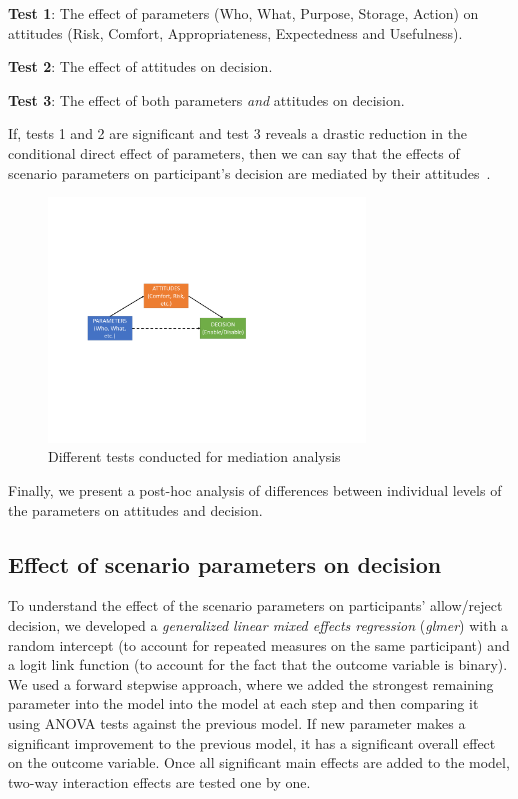 \textbf{Test 1}: The effect of parameters (Who, What, Purpose, Storage, Action) on attitudes (Risk, Comfort, Appropriateness, Expectedness and Usefulness).

\textbf{Test 2}: The effect of attitudes on decision.

\textbf{Test 3}: The effect of both parameters \emph{and} attitudes on decision.

If, tests 1 and 2 are significant and test 3 reveals a drastic reduction in the conditional direct effect of parameters, then we can say that the effects of scenario parameters on participant's decision are mediated by their attitudes~\cite{bahiratiui2018}.


\begin{figure}
	\centering
	\includegraphics[width=0.75\textwidth]{figures/mediation_test.pdf}
	\caption{Different tests conducted for mediation analysis}
	\label{fig:mediation_test}
\end{figure}


Finally, we present a post-hoc analysis of differences between individual levels of the parameters on attitudes and decision.

\subsection{Effect of scenario parameters on decision}
To understand the effect of the scenario parameters on participants' allow/reject decision, we developed a \emph{generalized linear mixed effects regression} (\emph{glmer}) with a random intercept (to account for repeated measures on the same participant) and a logit link function (to account for the fact that the outcome variable is binary). We used a forward stepwise approach, where we added the strongest remaining parameter into the model into the model at each step and then comparing it using ANOVA tests against the previous model. If new parameter makes a significant improvement to the previous model, it has a significant overall effect on the outcome variable. Once all significant main effects are added to the model, two-way interaction effects are tested one by one. 

